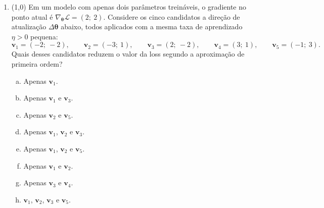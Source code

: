 \documentclass[11pt,a4paper]{article}
\begin{document}
\begin{enumerate}[1)]
\begin{minipage}[t]{0.47\linewidth}
\begin{enumerate}[a)]
    \item Prevista $-3{,}20$ e real $-2{,}72$.
    \item Prevista $-2{,}72$ e real $-3{,}20$.
    \item Prevista $-3{,}20$ e real $-3{,}20$.
    \item Prevista $-0{,}32$ e real $-2{,}72$.
\end{enumerate}
\end{minipage}\hfill
\begin{minipage}[t]{0.47\linewidth}
\begin{enumerate}[a)]
\setcounter{enumii}{4}
    \item Prevista $-3{,}20$ e real $-3{,}08$.
    \item Prevista $-2{,}00$ e real $-2{,}16$.
    \item Prevista $-3{,}20$ e real $-3{,}68$.
    \item Prevista $-6{,}40$ e real $-2{,}72$.
\end{enumerate}
\end{minipage}

\item (1{,}0) Em um modelo com apenas dois parâmetros treináveis, o gradiente no ponto atual é $\nabla_{\boldsymbol{\theta}}\mathcal{L} = (2;\ 2)$. Considere os cinco candidatos a direção de atualização $\Delta\boldsymbol{\theta}$ abaixo, todos aplicados com a mesma taxa de aprendizado $\eta > 0$ pequena:
\[
\mathbf{v}_1 = (-2;\ -2), \qquad
\mathbf{v}_2 = (-3;\ 1), \qquad
\mathbf{v}_3 = (2;\ -2), \qquad
\mathbf{v}_4 = (3;\ 1), \qquad
\mathbf{v}_5 = (-1;\ 3).
\]
Quais desses candidatos reduzem o valor da loss segundo a aproximação de primeira ordem?

\begin{minipage}[t]{0.47\linewidth}
\begin{enumerate}[a)]
    \item Apenas $\mathbf{v}_1$.
    \item Apenas $\mathbf{v}_1$ e $\mathbf{v}_3$.
    \item Apenas $\mathbf{v}_2$ e $\mathbf{v}_5$.
    \item Apenas $\mathbf{v}_1$, $\mathbf{v}_2$ e $\mathbf{v}_3$.
\end{enumerate}
\end{minipage}\hfill
\begin{minipage}[t]{0.47\linewidth}
\begin{enumerate}[a)]
\setcounter{enumii}{4}
    \item Apenas $\mathbf{v}_1$, $\mathbf{v}_2$ e $\mathbf{v}_5$.
    \item Apenas $\mathbf{v}_1$ e $\mathbf{v}_2$.
    \item Apenas $\mathbf{v}_3$ e $\mathbf{v}_4$.
    \item $\mathbf{v}_1$, $\mathbf{v}_2$, $\mathbf{v}_3$ e $\mathbf{v}_5$.
\end{enumerate}
\end{minipage}


\end{enumerate}
\end{document}
